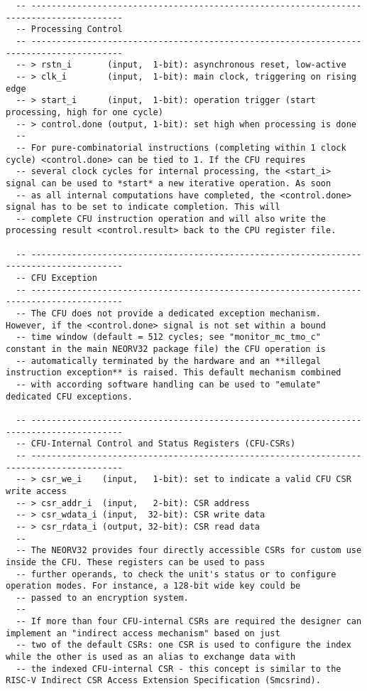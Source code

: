 \begin{code}
\begin{verbatim}
  -- ----------------------------------------------------------------------------------------
  -- Processing Control
  -- ----------------------------------------------------------------------------------------
  -- > rstn_i       (input,  1-bit): asynchronous reset, low-active
  -- > clk_i        (input,  1-bit): main clock, triggering on rising edge
  -- > start_i      (input,  1-bit): operation trigger (start processing, high for one cycle)
  -- > control.done (output, 1-bit): set high when processing is done
  --
  -- For pure-combinatorial instructions (completing within 1 clock cycle) <control.done> can be tied to 1. If the CFU requires
  -- several clock cycles for internal processing, the <start_i> signal can be used to *start* a new iterative operation. As soon
  -- as all internal computations have completed, the <control.done> signal has to be set to indicate completion. This will
  -- complete CFU instruction operation and will also write the processing result <control.result> back to the CPU register file.

  -- ----------------------------------------------------------------------------------------
  -- CFU Exception
  -- ----------------------------------------------------------------------------------------
  -- The CFU does not provide a dedicated exception mechanism. However, if the <control.done> signal is not set within a bound
  -- time window (default = 512 cycles; see "monitor_mc_tmo_c" constant in the main NEORV32 package file) the CFU operation is
  -- automatically terminated by the hardware and an **illegal instruction exception** is raised. This default mechanism combined
  -- with according software handling can be used to "emulate" dedicated CFU exceptions.

  -- ----------------------------------------------------------------------------------------
  -- CFU-Internal Control and Status Registers (CFU-CSRs)
  -- ----------------------------------------------------------------------------------------
  -- > csr_we_i    (input,   1-bit): set to indicate a valid CFU CSR write access
  -- > csr_addr_i  (input,   2-bit): CSR address
  -- > csr_wdata_i (input,  32-bit): CSR write data
  -- > csr_rdata_i (output, 32-bit): CSR read data
  --
  -- The NEORV32 provides four directly accessible CSRs for custom use inside the CFU. These registers can be used to pass
  -- further operands, to check the unit's status or to configure operation modes. For instance, a 128-bit wide key could be
  -- passed to an encryption system.
  --
  -- If more than four CFU-internal CSRs are required the designer can implement an "indirect access mechanism" based on just
  -- two of the default CSRs: one CSR is used to configure the index while the other is used as an alias to exchange data with
  -- the indexed CFU-internal CSR - this concept is similar to the RISC-V Indirect CSR Access Extension Specification (Smcsrind).



\end{verbatim}
\end{code}
